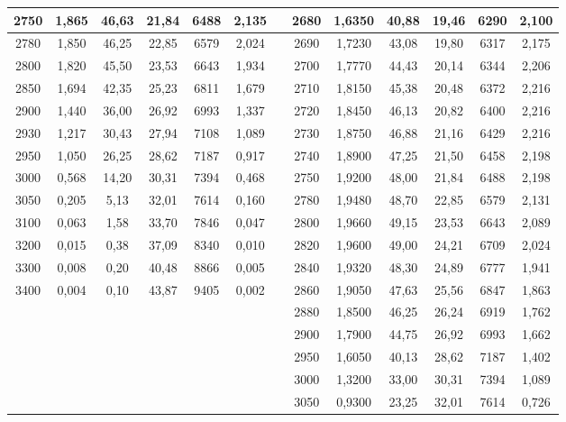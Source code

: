 \documentclass[a4paper, 12pt]{article}
\begin{document}
\begin{table}[!htb]
{\begin{tabular}{|c|c|c|c|c|c|c|c|c|c|c|c|c|}
2750   & 1,865 & 46,63 & 21,84 & 6488 & 2,135 &  & 2680   & 1,6350 & 40,88 & 19,46 & 6290 & 2,100 \\ \hline
2780   & 1,850 & 46,25 & 22,85 & 6579 & 2,024 &  & 2690   & 1,7230 & 43,08 & 19,80 & 6317 & 2,175 \\ \hline
2800   & 1,820 & 45,50 & 23,53 & 6643 & 1,934 &  & 2700   & 1,7770 & 44,43 & 20,14 & 6344 & 2,206 \\ \hline
2850   & 1,694 & 42,35 & 25,23 & 6811 & 1,679 &  & 2710   & 1,8150 & 45,38 & 20,48 & 6372 & 2,216 \\ \hline
2900   & 1,440 & 36,00 & 26,92 & 6993 & 1,337 &  & 2720   & 1,8450 & 46,13 & 20,82 & 6400 & 2,216 \\ \hline
2930   & 1,217 & 30,43 & 27,94 & 7108 & 1,089 &  & 2730   & 1,8750 & 46,88 & 21,16 & 6429 & 2,216 \\ \hline
2950   & 1,050 & 26,25 & 28,62 & 7187 & 0,917 &  & 2740   & 1,8900 & 47,25 & 21,50 & 6458 & 2,198 \\ \hline
3000   & 0,568 & 14,20 & 30,31 & 7394 & 0,468 &  & 2750   & 1,9200 & 48,00 & 21,84 & 6488 & 2,198 \\ \hline
3050   & 0,205 & 5,13  & 32,01 & 7614 & 0,160 &  & 2780   & 1,9480 & 48,70 & 22,85 & 6579 & 2,131 \\ \hline
3100   & 0,063 & 1,58  & 33,70 & 7846 & 0,047 &  & 2800   & 1,9660 & 49,15 & 23,53 & 6643 & 2,089 \\ \hline
3200   & 0,015 & 0,38  & 37,09 & 8340 & 0,010 &  & 2820   & 1,9600 & 49,00 & 24,21 & 6709 & 2,024 \\ \hline
3300   & 0,008 & 0,20  & 40,48 & 8866 & 0,005 &  & 2840   & 1,9320 & 48,30 & 24,89 & 6777 & 1,941 \\ \hline
3400   & 0,004 & 0,10  & 43,87 & 9405 & 0,002 &  & 2860   & 1,9050 & 47,63 & 25,56 & 6847 & 1,863 \\ \hline
       &       &       &       &      &       &  & 2880   & 1,8500 & 46,25 & 26,24 & 6919 & 1,762 \\ \hline
       &       &       &       &      &       &  & 2900   & 1,7900 & 44,75 & 26,92 & 6993 & 1,662 \\ \hline
       &       &       &       &      &       &  & 2950   & 1,6050 & 40,13 & 28,62 & 7187 & 1,402 \\ \hline
       &       &       &       &      &       &  & 3000   & 1,3200 & 33,00 & 30,31 & 7394 & 1,089 \\ \hline
       &       &       &       &      &       &  & 3050   & 0,9300 & 23,25 & 32,01 & 7614 & 0,726 \\ \hline

\end{tabular}}
\end{table}
\end{document}

